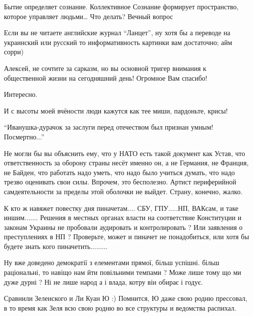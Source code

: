 \begin{itemize}

Бытие определяет сознание. Коллективное Сознание формирует пространство, которое управляет людьми…
Что делать? Вечный вопрос


Если вы не читаете английские журнал \enquote{Ланцет}, ну хотя бы а переводе на
украинский или русский то информативность картинки вам достаточно; айм сорри)

Алексей, не сочтите за сарказм, но вы основной тригер внимания к общественной
жизни на сегодняшний день! Огромное Вам спасибо!


Интересно.


И с высоты моей вчёности люди кажутся как тее миши, пардоньте, крисы!


\enquote{Иванушка-дурачок за заслуги перед отечеством был признан умным! Посмертно...}


Не могли бы вы объяснить ему, что у НАТО есть такой документ как Устав, что
ответственность за оборону страны несёт именно он, а не Германия, не Франция,
не Байден, что работать надо уметь, что надо было учиться думать, что надо
трезво оценивать свои силы. Впрочем, это бесполезно. Артист периферийной
самдеятельности за пределы этой оболочки не выйдет. Страну, конечно, жалко.


К кто ж навяжет повестку дня пиначетам.... СБУ, ГПУ.....НП, ВАКсам, и таке
иншим.......  Решения в местных органах власти на соответствие Конституции и
законам Украины не пробовали аудировать и контролировать ? Или заявления о
преступлениях в НП ?  Проверьте, может и пиначет не понадобиться, или хотя бы
будете знать кого пиначетить.........


Ну вже доведено демократії з елементами прямої, більш успішні. більш раціональні, то навіщо нам йти повільними темпами ? Може лише тому що ми дуже дурні ? Ні не лише народ а і влада, котру він обирає і годує.


Сравнили Зеленского и Ли Куан Ю :)  Помнится, Ю даже свою родню прессовал, в то
время как Зеля всю свою родню во все структуры и ведомства распихал.


\end{itemize}
